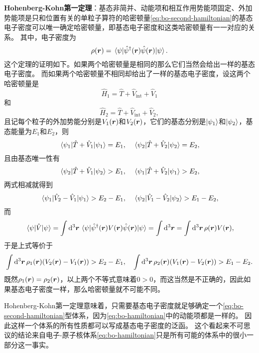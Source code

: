 \documentclass[hyperref, UTF8, a4paper]{ctexart}
\begin{document}
\textbf{Hohenberg-Kohn第一定理}：基态非简并、动能项和相互作用势能项固定、外加势能项是只和位置有关的单粒子算符的哈密顿量\eqref{eq:bo-second-hamiltonian}的基态电子密度可以唯一确定哈密顿量，即基态电子密度和这类哈密顿量有一一对应的关系。
其中，电子密度为
\begin{equation}
    \rho(\vb*{r}) = \mel{\psi}{\hat{\psi}^\dagger(\vb*{r}) \hat{\psi}(\vb*{r})}{\psi}.
\end{equation}
这个定理的证明如下。如果两个哈密顿量是相同的那么它们当然会给出一样的基态电子密度。
而如果两个哈密顿量不相同却给出了一样的基态电子密度，设这两个哈密顿量是
\[
    \hat{H}_1 = \hat{T} + \hat{V}_\text{int} + \hat{V}_1
\]
和
\[
    \hat{H}_2 = \hat{T} + \hat{V}_\text{int} + \hat{V}_2,
\]
且记每个粒子的外加势能分别是$V_1(\vb*{r})$和$V_2(\vb*{r})$，它们的基态分别是$\ket{\psi_1}$和$\ket{\psi_2}$，基态能量为$E_1$和$E_2$，则
\[
    \mel{\psi_1}{\hat{T} + \hat{V}_1}{\psi_1} = E_1, \quad \mel{\psi_2}{\hat{T} + \hat{V}_2}{\psi_2} = E_2,
\]
且由基态唯一性有
\[
    \mel{\psi_2}{\hat{T} + \hat{V}_1}{\psi_2} > E_1, \quad \mel{\psi_1}{\hat{T} + \hat{V}_2}{\psi_1} > E_2,
\]
两式相减就得到
\[
    \mel{\psi_1}{\hat{V}_2 - \hat{V}_1}{\psi_1} > E_2 - E_1, \quad \mel{\psi_2}{\hat{V}_1 - \hat{V}_2}{\psi_2} > E_1 - E_2,
\]
而
\[
    \mel{\psi}{\hat{V}}{\psi} = \int \dd[3]{\vb*{r}} \mel{\psi}{\hat{\psi}^\dagger(\vb*{r}) V(\vb*{r}) \hat{\psi}(\vb*{r})}{\psi} = \int \dd[3]{\vb*{r}} = \int \dd[3]{\vb*{r}} \rho(\vb*{r}) V(\vb*{r}),
\]
于是上式等价于
\[
    \int \dd[3]{\vb*{r}} \rho_1(\vb*{r}) (V_2(\vb*{r}) - V_1(\vb*{r})) > E_2 - E_1, \quad \int \dd[3]{\vb*{r}} \rho_2(\vb*{r}) (V_1(\vb*{r}) - V_2(\vb*{r})) > E_1 - E_2.
\]
既然$\rho_1(\vb*{r}) = \rho_2(\vb*{r})$，以上两个不等式意味着$0 > 0$，而这当然是不正确的，因此如果基态电子密度一样，那么哈密顿量就不可能不同。

Hohenberg-Kohn第一定理意味着，只需要基态电子密度就足够确定一个\eqref{eq:bo-second-hamiltonian}型体系，因为\eqref{eq:bo-hamiltonian}中的动能项都是一样的。
因此这样一个体系的所有性质都可以写成基态电子密度的泛函。
这个看起来不可思议的结论来自电子-原子核体系\eqref{eq:bo-hamiltonian}只是所有可能的体系中的很小一部分这一事实。
\end{document}

